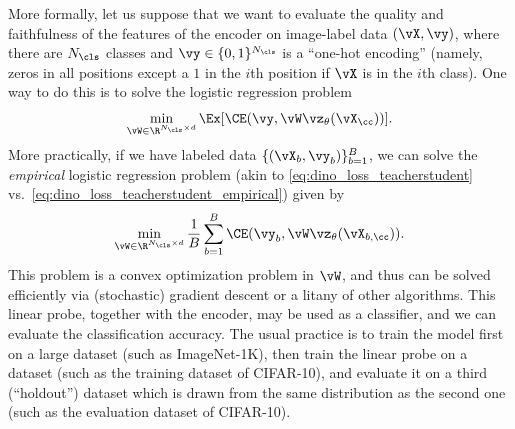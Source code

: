 \documentclass[../../book-main.tex]{subfiles}
\begin{document}
More formally, let us suppose that we want to evaluate the quality and faithfulness of the features of the encoder on image-label data \((\vX, \vy)\), where there are \(N_{\cls}\) classes and \(\vy \in \{0, 1\}^{N_{\cls}}\) is a ``one-hot encoding'' (namely, zeros in all positions except a \(1\) in the \(i\)th position if \(\vX\) is in the \(i\)th class). One way to do this is to solve the logistic regression problem 
\begin{equation}\label{eq:linear_probing}
    \min_{\vW \in \R^{N_{\cls} \times d}}\Ex[\CE(\vy, \vW \vz_{\theta}(\vX_{\cc}))].
\end{equation}
More practically, if we have labeled data \(\{(\vX_{b}, \vy_{b})\}_{b = 1}^{B}\), we can solve the \textit{empirical} logistic regression problem (akin to \eqref{eq:dino_loss_teacherstudent} vs.~\eqref{eq:dino_loss_teacherstudent_empirical}) given by 
\begin{equation}\label{eq:linear_probing_empirical}
    \min_{\vW \in \R^{N_{\cls} \times d}}\frac{1}{B}\sum_{b = 1}^{B}\CE(\vy_{b}, \vW \vz_{\theta}(\vX_{b, \cc})).
\end{equation}
This problem is a convex optimization problem in \(\vW\), and thus can be solved efficiently via (stochastic) gradient descent or a litany of other algorithms. This linear probe, together with the encoder, may be used as a classifier, and we can evaluate the classification accuracy. The usual practice is to train the model first on a large dataset (such as ImageNet-1K), then train the linear probe on a dataset (such as the training dataset of CIFAR-10), and evaluate it on a third (``holdout'') dataset which is drawn from the same distribution as the second one (such as the evaluation dataset of CIFAR-10).
\end{document}
